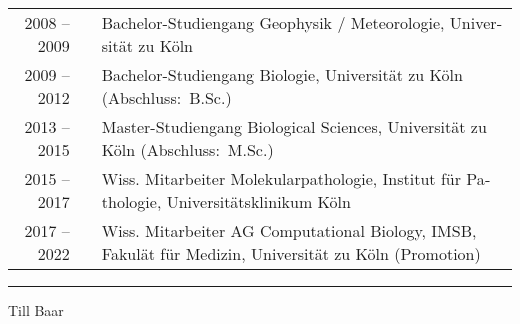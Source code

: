\begin{otherlanguage}{german}
\noindent\begin{tabularx}{\textwidth}{rcX}
2008 -- 2009 & & Bachelor-Studiengang Geophysik / Meteorologie, Universität zu
                 Köln \\
2009 -- 2012 & & Bachelor-Studiengang Biologie, Universität zu Köln
                 \hfill (Abschluss:~B.Sc.) \\
2013 -- 2015 & & Master-Studiengang Biological Sciences, Universität zu Köln
                 \hfill (Abschluss:~M.Sc.) \\
2015 -- 2017 & & Wiss. Mitarbeiter Molekularpathologie, Institut für
                 Pathologie, Universitätsklinikum Köln \\
2017 -- 2022 & & Wiss. Mitarbeiter AG Computational Biology, IMSB, Fakulät für
                 Medizin, Universität zu Köln \hfill (Promotion) \\
\end{tabularx}


\vfill
\hrule
\vspace{\dp\strutbox}

Till Baar

\end{otherlanguage}